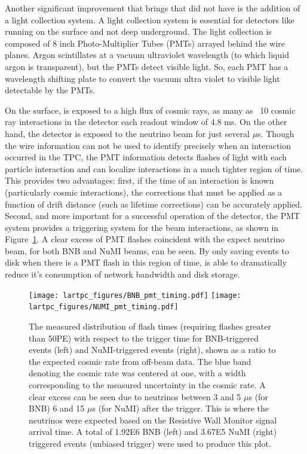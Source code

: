 Another significant improvement that \uboone brings that \argoneut did not have is the addition of a light collection system.  A light collection system is essential for detectors like \uboone running on the surface and not deep underground.  The \uboone light collection is composed of 8 inch Photo-Multiplier Tubes (PMTs) arrayed behind the wire planes.  Argon scintillates at a vacuum ultraviolet wavelength (to which liquid argon is transparent), but the PMTs detect visible light.  So, each PMT has a wavelength shifting plate to convert the vacuum ultra violet to visible light detectable by the PMTs.

On the surface, \uboone is exposed to a high flux of cosmic rays, as many as ~10 cosmic ray interactions in the detector each readout window of 4.8 ms.  On the other hand, the detector is exposed to the neutrino beam for just several $\mu$s.  Though the wire information can not be used to identify precisely when an interaction occurred in the TPC, the PMT information detects flashes of light with each particle interaction and can localize interactions in a much tighter region of time.  This provides two advantages: first, if the time of an interaction is known (particularly cosmic interactions), the corrections that must be applied as a function of drift distance (such as lifetime corrections) can be accurately applied.  Second, and more important for a successful operation of the detector, the PMT system provides a triggering system for the beam interactions, as shown in Figure~\ref{fig:pmt_timing}.  A clear excess of PMT flashes coincident with the expect neutrino beam, for both BNB and NuMI beams, can be seen.  By only saving events to disk when there is a PMT flash in this region of time, \uboone is able to dramatically reduce it's consumption of network bandwidth and disk storage.

\begin{figure}[htb]
  \centering
  \texttt{[image: lartpc\_figures/BNB\_pmt\_timing.pdf]}
  \texttt{[image: lartpc\_figures/NUMI\_pmt\_timing.pdf]}
  \caption[\uboone O2 Contamination]{The measured distribution of flash times (requiring flashes greater than 50PE) with respect to the trigger time for BNB-triggered events (left) and NuMI-triggered events (right), shown as a ratio to the expected cosmic rate from off-beam data. The blue band denoting the cosmic rate was centered at one, with a width corresponding to the measured uncertainty in the cosmic rate. A clear excess can be seen due to neutrinos between 3 and 5 $\mu$s (for BNB) 6 and 15 $\mu$s (for NuMI) after the trigger. This is where the neutrinos were expected based on the Resistive Wall Monitor signal arrival time. A total of 1.92E6 BNB (left) and 3.67E5 NuMI (right) triggered events (unbiased trigger) were used to produce this plot. \cite{uboone_pub_1010}}
  \label{fig:pmt_timing}
\end{figure}


